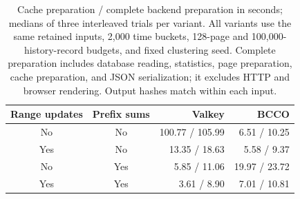 \begin{table}[t]
\centering
\small
\begin{tabular}{ccrr}
\hline
Range updates & Prefix sums & Valkey & BCCO \\
\hline
No & No & 100.77 / 105.99 & 6.51 / 10.25 \\
Yes & No & 13.35 / 18.63 & 5.58 / 9.37 \\
No & Yes & 5.85 / 11.06 & 19.97 / 23.72 \\
Yes & Yes & 3.61 / 8.90 & 7.01 / 10.81 \\
\hline
\end{tabular}
\caption{Cache preparation / complete backend preparation in seconds; medians of three interleaved trials per variant. All variants use the same retained inputs, 2,000 time buckets, 128-page and 100,000-history-record budgets, and fixed clustering seed. Complete preparation includes database reading, statistics, page preparation, cache preparation, and JSON serialization; it excludes HTTP and browser rendering. Output hashes match within each input.}
\label{tab:heaplens-backend-ablation}
\end{table}
